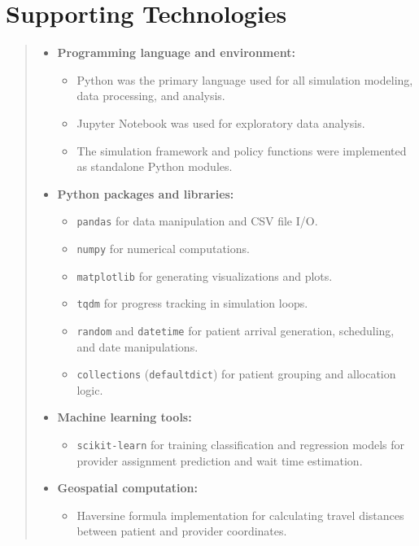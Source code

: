\documentclass[ %
                    author={Nattanan Nawakitbamrung},
                supervisor={Dr. Sébastien Rochat},
                    degree={MSc},
                     title={Developing and Evaluating the Impact of a Single Patient Treatment List (PTL) for an NHS Integrated Care System},
                  subtitle={},
                      type={},
                      year={2025}]{dissertation}
\begin{document}
\chapter*{Supporting Technologies}
\begin{quote}
\noindent
\vspace{-0.5cm}
\begin{itemize}
    \item \textbf{Programming language and environment:}
    \begin{itemize}
        \item Python was the primary language used for all simulation modeling, data processing, and analysis.
        \item Jupyter Notebook was used for exploratory data analysis.
        \item The simulation framework and policy functions were implemented as standalone Python modules.
    \end{itemize}

    \item \textbf{Python packages and libraries:}
    \begin{itemize}
        \item \texttt{pandas} for data manipulation and CSV file I/O.
        \item \texttt{numpy} for numerical computations.
        \item \texttt{matplotlib} for generating visualizations and plots.
        \item \texttt{tqdm} for progress tracking in simulation loops.
        \item \texttt{random} and \texttt{datetime} for patient arrival generation, scheduling, and date manipulations.
        \item \texttt{collections} (\texttt{defaultdict}) for patient grouping and allocation logic.
    \end{itemize}

    \item \textbf{Machine learning tools:}
    \begin{itemize}
        \item \texttt{scikit-learn} for training classification and regression models for provider assignment prediction and wait time estimation.
    \end{itemize}

    \item \textbf{Geospatial computation:}
    \begin{itemize}
        \item Haversine formula implementation for calculating travel distances between patient and provider coordinates.
    \end{itemize}


\end{itemize}
\end{quote}
\end{document}
